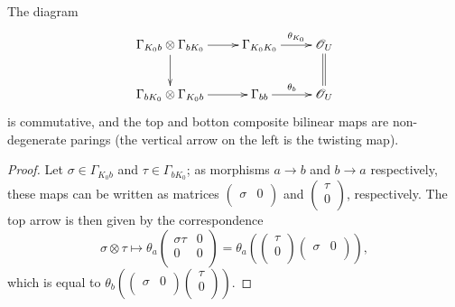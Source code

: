 \begin{proposition}\label{non_deg_pseudoab}
The diagram
$$
\xymatrix{
\Gamma_{K_0b}\otimes \Gamma_{bK_0}\ar[d]\ar[r] & \Gamma_{K_0K_0}\ar[r]^-{\theta_{K_0}} & \scr{O}_U\ar@{=}[d] \\
\Gamma_{bK_0}\otimes \Gamma_{K_0b}\ar[r] & \Gamma_{bb} \ar[r]^{\theta_b} & \scr{O}_U}
$$
is commutative, and the top and botton composite bilinear maps are non-degenerate parings (the vertical arrow on the left is the twisting map).
\end{proposition}
\begin{proof}
Let $\sigma \in \Gamma_{K_0b}$ and $\tau \in \Gamma_{bK_0}$; as morphisms $a\to b$ and $b\to a$ respectively, these maps can be written as matrices $\left (\begin{smallmatrix} \sigma & 0 \\ \end{smallmatrix}\right )$ and  $\left (\begin{smallmatrix} \tau \\ 0 \\ \end{smallmatrix}\right )$, respectively. The top arrow is then given by the correspondence
$$\sigma \otimes \tau \longmapsto \theta_a \left (\begin{smallmatrix} \sigma \tau & 0 \\ 0 & 0 \\ \end{smallmatrix}\right )=\theta_a\left ( \left (\begin{smallmatrix} \tau \\ 0 \\ \end{smallmatrix}\right )\left (\begin{smallmatrix} \sigma & 0 \\ \end{smallmatrix}\right )\right ),$$
which is equal to $\theta_b\left ( \left (\begin{smallmatrix} \sigma & 0 \\ \end{smallmatrix}\right )\left (\begin{smallmatrix} \tau \\ 0 \\ \end{smallmatrix}\right )\right )$.


\end{proof}
